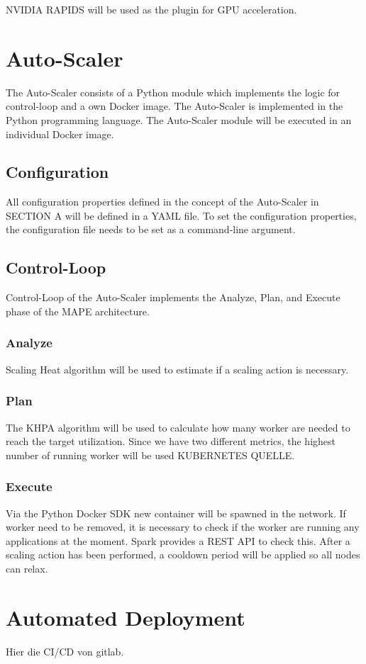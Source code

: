 NVIDIA RAPIDS will be used as the plugin for GPU acceleration.



\section{Auto-Scaler}
The Auto-Scaler consists of a Python module which implements the logic for control-loop and a own Docker image.
The Auto-Scaler is implemented in the Python programming language.
The Auto-Scaler module will be executed in an individual Docker image.

\subsection{Configuration}
All configuration properties defined in the concept of the Auto-Scaler in SECTION A will be defined in a YAML file.
To set the configuration properties, the configuration file needs to be set as a command-line argument.

\subsection{Control-Loop}
Control-Loop of the Auto-Scaler implements the Analyze, Plan, and Execute phase of the MAPE architecture.

\subsubsection{Analyze}
Scaling Heat algorithm will be used to estimate if a scaling action is necessary.

\subsubsection{Plan}
The KHPA algorithm will be used to calculate how many worker are needed to reach the target utilization. Since we have two different metrics, the highest number of running worker will be used KUBERNETES QUELLE.

\subsubsection{Execute}
Via the Python Docker SDK new container will be spawned in the network.
If worker need to be removed, it is necessary to check if the worker are running any applications at the moment. Spark provides a REST API to check this.
After a scaling action has been performed, a cooldown period will be applied so all nodes can relax.



\section{Automated Deployment}
Hier die CI/CD von gitlab.
